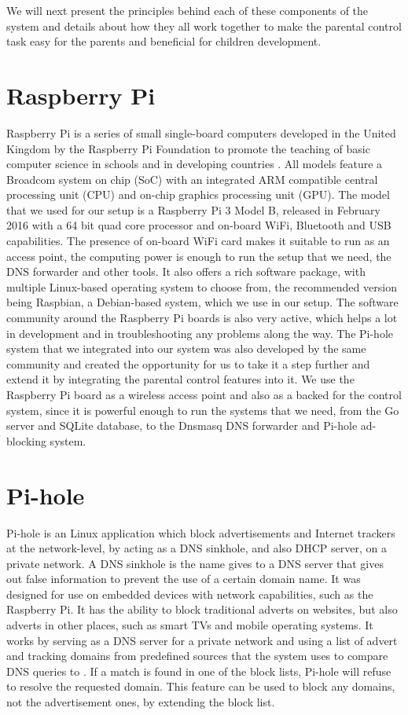 We will next present the principles behind each of these components of the system and details about how they all work together to make the parental control task easy for the parents and beneficial for children development.

\section{Raspberry Pi}

Raspberry Pi is a series of small single-board computers developed in the United Kingdom by the Raspberry Pi Foundation to promote the teaching of basic computer science in schools and in developing countries \citep{cellan2011raspberryPi}. All models feature a Broadcom system on chip (SoC) with an integrated ARM compatible central processing unit (CPU) and on-chip graphics processing unit (GPU). The model that we used for our setup is a Raspberry Pi 3 Model B, released in February 2016 with a 64 bit quad core processor and on-board WiFi, Bluetooth and USB capabilities. The presence of on-board WiFi card makes it suitable to run as an access point, the computing power is enough to run the setup that we need, the DNS forwarder and other tools. It also offers a rich software package, with multiple Linux-based operating system to choose from, the recommended version being Raspbian, a Debian-based system, which we use in our setup. The software community around the Raspberry Pi boards is also very active, which helps a lot in development and in troubleshooting any problems along the way. The Pi-hole system that we integrated into our system was also developed by the same community and created the opportunity for us to take it a step further and extend it by integrating the parental control features into it. We use the Raspberry Pi board as a wireless access point and also as a backed for the control system, since it is powerful enough to run the systems that we need, from the Go server and SQLite database, to the Dnsmasq DNS forwarder and Pi-hole ad-blocking system.

\section{Pi-hole}

Pi-hole is an Linux application which block advertisements and Internet trackers at the network-level, by acting as a DNS sinkhole, and also DHCP server, on a private network. A DNS sinkhole is the name gives to a DNS server that gives out false information to prevent the use of a certain domain name. It was designed for use on embedded devices with network capabilities, such as the Raspberry Pi. It has the ability to block traditional adverts on websites, but also adverts in other places, such as smart TVs and mobile operating systems. It works by serving as a DNS server for a private network and using a list of advert and tracking domains from predefined sources that the system uses to compare DNS queries to \citep{salmela2015pihole}. If a match is found in one of the block lists, Pi-hole will refuse to resolve the requested domain. This feature can be used to block any domains, not the advertisement ones, by extending the block list. 

